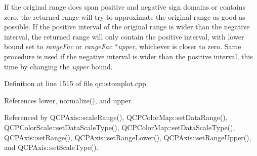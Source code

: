 If the original range does span positive and negative sign domains or contains zero, the returned range will try to approximate the original range as good as possible. If the positive interval of the original range is wider than the negative interval, the returned range will only contain the positive interval, with lower bound set to {\itshape range\+Fac} or {\itshape range\+Fac} $\ast${\itshape upper}, whichever is closer to zero. Same procedure is used if the negative interval is wider than the positive interval, this time by changing the {\itshape upper} bound. 

Definition at line 1515 of file qcustomplot.\+cpp.



References lower, normalize(), and upper.



Referenced by Q\+C\+P\+Axis\+::scale\+Range(), Q\+C\+P\+Color\+Map\+::set\+Data\+Range(), Q\+C\+P\+Color\+Scale\+::set\+Data\+Scale\+Type(), Q\+C\+P\+Color\+Map\+::set\+Data\+Scale\+Type(), Q\+C\+P\+Axis\+::set\+Range(), Q\+C\+P\+Axis\+::set\+Range\+Lower(), Q\+C\+P\+Axis\+::set\+Range\+Upper(), and Q\+C\+P\+Axis\+::set\+Scale\+Type().


